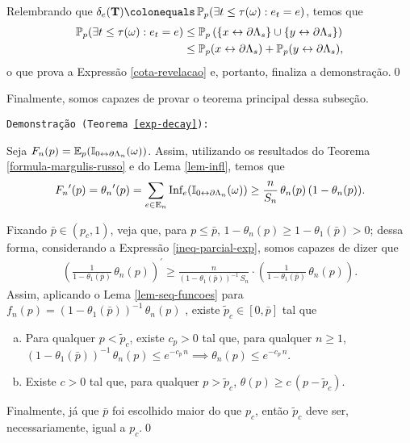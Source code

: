 \par Relembrando que $\delta_e(\text{\textbf{T}}) \colonequals \PX_p(\exists t \leq \tau(\omega) : e_t = e)$, temos que
\begin{align*}
	\operatorname{\mathbb{P}}_p(\exists t \leq \tau(\omega) : e_t = e) &\leq \operatorname{\mathbb{P}}_p\left(\{x \leftrightarrow \partial\Lambda_s\} \cup \{y \leftrightarrow \partial\Lambda_s\}\right) \\
	&\leq \operatorname{\mathbb{P}}_p(x \leftrightarrow \partial\Lambda_s) + \operatorname{\mathbb{P}}_p(y \leftrightarrow \partial\Lambda_s),
\end{align*}
o que prova a Expressão \eqref{cota-revelacao} e, portanto, finaliza a demonstração.\hspace{\fill}\qed

\par Finalmente, somos capazes de provar o teorema principal dessa subseção.

\par \texttt{Demonstração (Teorema \ref{exp-decay}):}

\par Seja $F_n(p) = \operatorname{\mathbb{E}}_p(\operatorname{\mathbb{I}}_{0 \leftrightarrow \partial\Lambda_n}(\omega))$. Assim, utilizando os resultados do Teorema \ref{formula-margulis-russo} e do Lema \ref{lem-infl}, temos que
\begin{align} \label{ineq-parcial-exp}
	{F_n}^{\prime}(p) = {\theta_n}^{\prime}(p) = \sum_{e \in \text{E}_n}\text{Inf}_e(\operatorname{\mathbb{I}}_{0 \leftrightarrow \partial\Lambda_n}(\omega)) \geq \frac{n}{S_n} \, \theta_n(p) \, (1 - \theta_n(p)).
\end{align}

\par Fixando $\bar{p} \in (p_c, 1)$, veja que, para $p \leq \bar{p}$, $1 - \theta_n(p) \geq 1 - \theta_1(\bar{p}) > 0$; dessa forma, considerando a Expressão \eqref{ineq-parcial-exp}, somos capazes de dizer que
\begin{align*}
\left(\frac{1}{1 - \theta_1(\bar{p})}\,\theta_n(p)\right)^{\prime} \geq \frac{n}{(1 - \theta_1(\bar{p}))^{-1}\, S_n} \cdot \left(\frac{1}{1 - \theta_1(\bar{p})}\,\theta_n(p)\right).
\end{align*}
Assim, aplicando o Lema \ref{lem-seq-funcoes} para $f_n(p) = (1 - \theta_1(\bar{p}))^{-1}\,\theta_n(p)$ , existe $\tilde{p}_c \in [0, \bar{p}]$ tal que
\begin{enumerate}[a.]
	\item Para qualquer $p < \tilde{p}_c$, existe $c_p > 0$ tal que, para qualquer $n \geq 1$, $(1 - \theta_1(\bar{p}))^{-1} \,\theta_n(p) \leq e^{-c_p\,n} \implies \theta_n(p) \leq e^{-c_p\,n}$.
	\item Existe $c > 0$ tal que, para qualquer $p > \tilde{p}_c$, $\theta(p) \geq c\,(p - \tilde{p}_c)$.
\end{enumerate}

\par Finalmente, já que $\bar{p}$ foi escolhido maior do que $p_c$, então $\tilde{p}_c$ deve ser, necessariamente, igual a $p_c$.\hspace{\fill}\qed